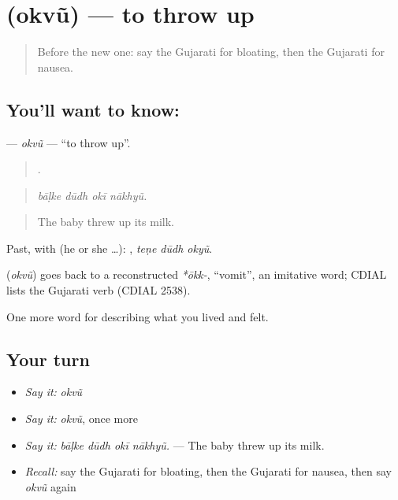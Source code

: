 \section[\texorpdfstring{\gu{ઓકવું} (okvũ)}{ઓકવું (okvũ)}]{ (okvũ) — to throw up}

\label{lesson:GU-C477-okvu}



\begin{quote}
Before the new one: say the Gujarati for bloating, then the Gujarati for nausea.
\end{quote}

\subsection*{You'll want to know: }
\textbf{} — \emph{okvũ} — \textquotedblleft{}to throw up\textquotedblright{}.

\begin{quote}
   .
\end{quote}

\begin{quote}
\emph{bāḷke dūdh okī nākhyũ.}
\end{quote}

\begin{quote}
The baby threw up its milk.
\end{quote}

Past, with  (he or she …):   , \emph{teṇe dūdh okyũ}.

\begin{cousinweb}
\textbf{} (\emph{okvũ}) goes back to a reconstructed \emph{*ōkk-}, \textquotedblleft{}vomit\textquotedblright{}, an imitative word; CDIAL lists the Gujarati verb (CDIAL 2538).
\end{cousinweb}

\begin{grammarlens}[title={What you've built}]
One more word for describing what you lived and felt.
\end{grammarlens}

\subsection*{Your turn}
\begin{itemize}
\raggedright
  \item \emph{Say it:} \emph{okvũ}
  \item \emph{Say it:} \emph{okvũ}, once more
  \item \emph{Say it:} \emph{bāḷke dūdh okī nākhyũ.} — The baby threw up its milk.
  \item \emph{Recall:} say the Gujarati for bloating, then the Gujarati for nausea, then say \emph{okvũ} again
\end{itemize}

